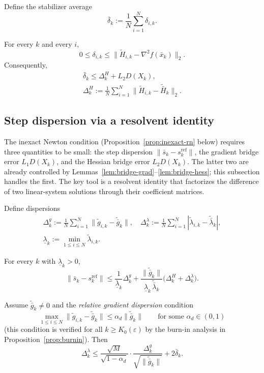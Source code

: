 \documentclass[review,onefignum,onetabnum]{siamart171218}
\begin{document}
Define the stabilizer average
\[
\bar\delta_k:=\frac1N\sum_{i=1}^N \delta_{i,k}.
\]

\begin{lemma}\label{lem:delta_control}
For every $k$ and every $i$,
\[
0\le \delta_{i,k}\le \big\|\tilde H_{i,k}-\nabla^2 f(\bar x_k)\big\|_2.
\]
Consequently,
\begin{gather*}
\bar\delta_k\le \Delta_k^H + L_2D(X_k),\\
\Delta_k^H:=\tfrac1N\!\sum_{i=1}^N\big\|\tilde H_{i,k}-\tilde{\bar H}_k\big\|_2 .
\end{gather*}
\end{lemma}

\subsection{Step dispersion via a resolvent identity}\label{ssec:stepdisp}
The inexact Newton condition (Proposition~\ref{prop:inexact-rn} below)
requires three quantities to be small: the step dispersion
$\|\bar s_k - s_k^{\mathrm{ref}}\|$, the gradient bridge error
$L_1 D(X_k)$, and the Hessian bridge error $L_2 D(X_k)$.
The latter two are already controlled by
Lemmas~\ref{lem:bridge-grad}--\ref{lem:bridge-hess};
this subsection handles the first.
The key tool is a resolvent identity that factorizes the
difference of two linear-system solutions through their
coefficient matrices.

Define dispersions
\begin{gather*}
\Delta_k^g:=\tfrac1N\textstyle\sum_{i=1}^N \|\tilde g_{i,k}-\tilde{\bar g}_k\|,\quad
\Delta_k^\lambda:=\tfrac1N\textstyle\sum_{i=1}^N |\tilde\lambda_{i,k}-\tilde{\bar\lambda}_k|,\\
\underline\lambda_k:=\min_{1\le i\le N}\tilde\lambda_{i,k}.
\end{gather*}

\begin{lemma}\label{lem:step-disp}
For every $k$ with $\underline\lambda_k>0$,
\[
\|\bar s_k-s_k^{\mathrm{ref}}\|
\le \frac{1}{\underline\lambda_k}\Delta_k^g
+\frac{\|\tilde{\bar g}_k\|}{\underline\lambda_k\,\tilde{\bar\lambda}_k}\big(\Delta_k^H+\Delta_k^\lambda\big).
\]
\end{lemma}

\begin{lemma}\label{lem:lambda_dispersion}
Assume $\tilde{\bar g}_k\neq 0$ and the \emph{relative gradient dispersion} condition
\begin{equation}\label{eq:rel_grad_disp}
\max_{1\le i\le N}\|\tilde g_{i,k}-\tilde{\bar g}_k\|\le \alpha_d\|\tilde{\bar g}_k\|
\qquad\text{for some }\alpha_d\in(0,1)
\end{equation}
(this condition is verified for all $k\ge K_0(\varepsilon)$ by the
burn-in analysis in Proposition~\ref{prop:burnin}).
Then
\begin{equation}\label{eq:lambda_disp_bound}
\Delta_k^\lambda
\le
\frac{\sqrt{M}}{\sqrt{1-\alpha_d}}\cdot\frac{\Delta_k^g}{\sqrt{\|\tilde{\bar g}_k\|}}
+2\bar\delta_k.
\end{equation}
\end{lemma}
\end{document}
